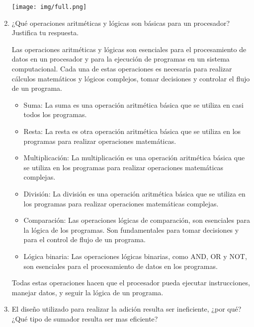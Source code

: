 \documentclass{article}
\begin{document}
\begin{enumerate}
\begin{center}
 \texttt{[image: img/full.png]}
\end{center}

\item ¿Qué operaciones aritméticas y lógicas son básicas para un procesador?\\
Justifica tu respuesta.

Las operaciones aritméticas y lógicas son esenciales para el procesamiento de datos en un procesador y para la ejecución de programas en un sistema computacional. Cada una de estas operaciones es necesaria para realizar cálculos matemáticos y lógicos complejos, tomar decisiones y controlar el flujo de un programa.
  
\begin{itemize}
    \item Suma: La suma es una operación aritmética básica que se utiliza en casi todos los programas. 

    \item Resta: La resta es otra operación aritmética básica que se utiliza en los programas para realizar operaciones matemáticas.

    \item Multiplicación: La multiplicación es una operación aritmética básica que se utiliza en los programas para realizar operaciones matemáticas complejas.

    \item División: La división es una operación aritmética básica que se utiliza en los programas para realizar operaciones matemáticas complejas. 
    
    \item Comparación: Las operaciones lógicas de comparación, son esenciales para la lógica de los programas. Son fundamentales para tomar decisiones y para el control de flujo de un programa.

    \item Lógica binaria: Las operaciones lógicas binarias, como AND, OR y NOT, son esenciales para el procesamiento de datos en los programas.

\end{itemize}

Todas estas operaciones hacen que el procesador pueda ejecutar instrucciones, manejar datos, y seguir la lógica de un programa.


\item El diseño utilizado para realizar la adición resulta ser ineficiente, ¿por qué? ¿Qué tipo de sumador resulta ser mas eficiente?



\end{enumerate}
\end{document}
